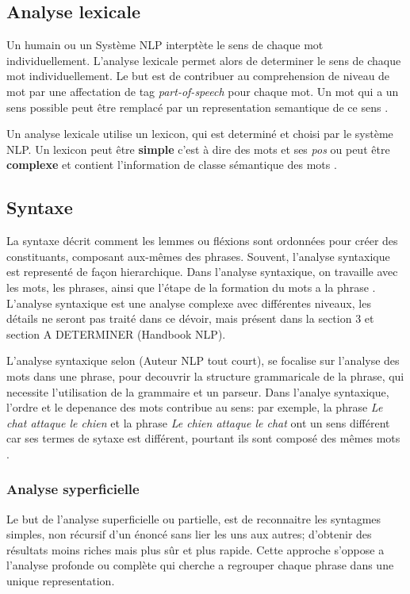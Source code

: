 \subsection{Analyse lexicale}
Un humain ou un Système NLP interptète le sens de chaque mot individuellement. L'analyse lexicale permet alors de determiner le sens de chaque mot individuellement. Le but est de contribuer au comprehension de niveau de mot par une affectation de tag \textit{part-of-speech} pour chaque mot. Un mot qui a un sens possible peut être remplacé par un representation semantique de ce sens \citep{natural-language-processing}.

Un analyse lexicale utilise un lexicon, qui est determiné et choisi par le système NLP. Un lexicon peut être \textbf{simple} c'est à dire des mots et ses \textit{pos} ou peut être \textbf{complexe} et contient l'information de classe sémantique des mots \citep{natural-language-processing}.

\subsection{Syntaxe}
La syntaxe décrit comment les lemmes ou fléxions sont ordonnées pour créer des constituants, composant aux-mêmes des phrases. Souvent, l'analyse syntaxique est representé de façon hierarchique. Dans l'analyse syntaxique, on travaille avec les mots, les phrases, ainsi que l'étape de la formation du mots a la phrase \citep{automatic-nlp}. L'analyse syntaxique est une analyse complexe avec différentes niveaux, les détails ne seront pas traité dans ce dévoir, mais présent dans la section 3 \citep{automatic-nlp} et section A DETERMINER (Handbook NLP).

L'analyse syntaxique selon (Auteur NLP tout court), se focalise sur l'analyse des mots dans une phrase, pour decouvrir la structure grammaricale de la phrase, qui necessite l'utilisation de la grammaire et un parseur. Dans l'analye syntaxique, l'ordre et le depenance des mots contribue au sens: par exemple, la phrase \textit{\og Le chat attaque le chien \fg{}} et la phrase \textit{\og Le chien attaque le chat \fg{}} ont un sens différent car ses termes de sytaxe est différent, pourtant ils sont composé des mêmes mots \citep{natural-language-processing}.

\subsubsection{Analyse syperficielle}
\citep{automatic-nlp} Le but de l'analyse superficielle ou partielle, est de reconnaitre les syntagmes simples, non récursif d'un énoncé sans lier les uns aux autres; d'obtenir des résultats moins riches mais plus sûr et plus rapide. Cette approche s'oppose a l'analyse profonde ou complète qui cherche a regrouper chaque phrase dans une unique representation.

